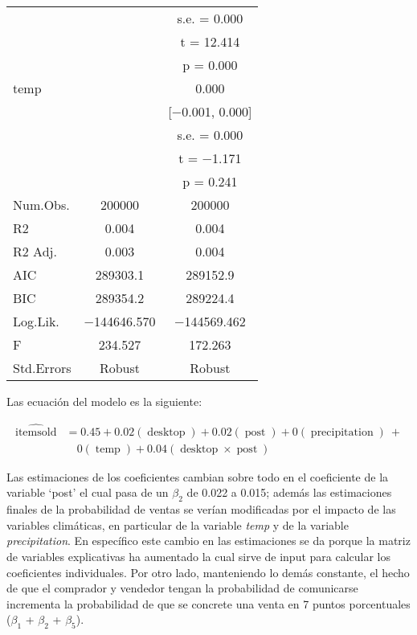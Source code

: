 \documentclass[
  12pt]{article}
\begin{document}
\begin{table}[H]
\begin{tabular}[t]{lcc}
 &  & s.e. = \vphantom{1} \num{0.000}\\
 &  & t = \num{12.414}\\
 &  & p = \num{0.000}\\
temp &  & \num{0.000}\\
 &  & {}[\num{-0.001}, \num{0.000}]\\
 &  & s.e. = \num{0.000}\\
 &  & t = \num{-1.171}\\
 &  & p = \num{0.241}\\
\midrule
Num.Obs. & \num{200000} & \num{200000}\\
R2 & \num{0.004} & \num{0.004}\\
R2 Adj. & \num{0.003} & \num{0.004}\\
AIC & \num{289303.1} & \num{289152.9}\\
BIC & \num{289354.2} & \num{289224.4}\\
Log.Lik. & \num{-144646.570} & \num{-144569.462}\\
F & \num{234.527} & \num{172.263}\\
Std.Errors & Robust & Robust\\
\bottomrule
\end{tabular}
\end{table}

Las ecuación del modelo es la siguiente:

\begin{equation}
\begin{aligned}
\operatorname{\widehat{itemsold}} &= 0.45 + 0.02(\operatorname{desktop}) + 0.02(\operatorname{post}) + 0(\operatorname{precipitation})\ + \\
&\quad 0(\operatorname{temp}) + 0.04(\operatorname{desktop} \times \operatorname{post})
\end{aligned}
\end{equation}

Las estimaciones de los coeficientes cambian sobre todo en el coeficiente de la variable `post' el cual pasa de un \(\beta_2\) de 0.022 a 0.015; además las estimaciones finales de la probabilidad de ventas se verían modificadas por el impacto de las variables climáticas, en particular de la variable \emph{temp} y de la variable \emph{precipitation}. En específico este cambio en las estimaciones se da porque la matriz de variables explicativas ha aumentado la cual sirve de input para calcular los coeficientes individuales.
Por otro lado, manteniendo lo demás constante, el hecho de que el comprador y vendedor tengan la probabilidad de comunicarse incrementa la probabilidad de que se concrete una venta en 7 puntos porcentuales (\(\beta_1\) + \(\beta_2\) + \(\beta_5\)).
\end{document}
